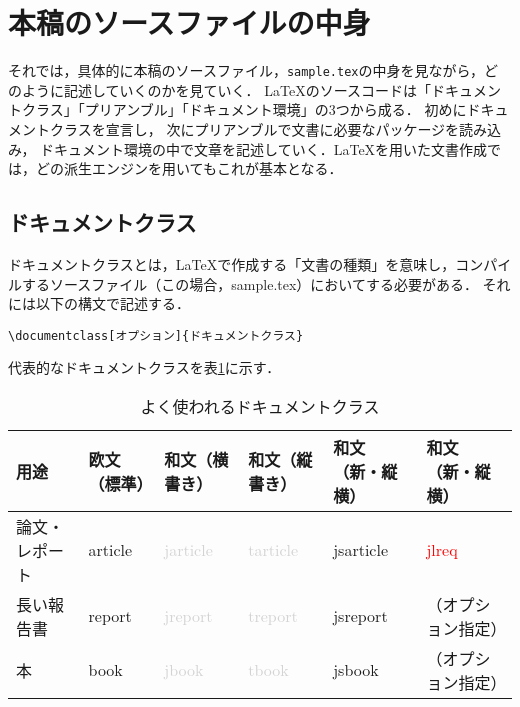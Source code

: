 \section{本稿のソースファイルの中身}

それでは，具体的に本稿のソースファイル，\texttt{sample.tex}の中身を見ながら，どのように記述していくのかを見ていく．
{\LaTeX}のソースコードは「ドキュメントクラス」「プリアンブル」「ドキュメント環境」の3つから成る． 初めにドキュメントクラスを宣言し， 次にプリアンブルで文書に必要なパッケージを読み込み， ドキュメント環境の中で文章を記述していく．{\LaTeX}を用いた文書作成では，どの派生エンジンを用いてもこれが基本となる．

\subsection{ドキュメントクラス}


ドキュメントクラスとは，{\LaTeX}で作成する「文書の種類」を意味し，コンパイルするソースファイル（この場合，{\ttfamily sample.tex}）においてする必要がある．
それには以下の構文で記述する．
\begin{tcolorbox}[colback=blue!5!white,colframe=blue!70!black]
\begin{lstlisting}
\documentclass[オプション]{ドキュメントクラス}
\end{lstlisting}
\end{tcolorbox}
\noindent 代表的なドキュメントクラスを表\ref{dcls}に示す．

\begin{table}[bt]
\centering
\caption{よく使われるドキュメントクラス}\label{dcls}
\begin{tabular}{|l||l|l|l|l|l|} \hline
\textsf{\small 用途} & \textsf{\small 欧文（標準）}& \textsf{\small 和文（横書き）}& \textsf{\small 和文（縦書き）}& \textsf{\small 和文（新・縦横）}&\textsf{\small 和文（新・縦横）}\\\hline
{\small 論文・レポート} & article & \textcolor{lightgray}{jarticle} & \textcolor{lightgray}{tarticle} & jsarticle&\textcolor{red}{jlreq}\\
{\small 長い報告書} & report & \textcolor{lightgray}{jreport} & \textcolor{lightgray}{treport} & jsreport&{\small （オプション指定）}\\
{\small 本} & book & \textcolor{lightgray}{jbook} & \textcolor{lightgray}{tbook} & jsbook&{\small （オプション指定）}\\ \hline 
\end{tabular}
\end{table}



